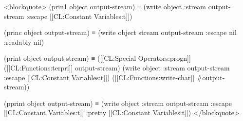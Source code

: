 <blockquote> 
(prin1 object output-stream) 
  ≡ (write object :stream output-stream :escape [[CL:Constant Variables:t]])

(princ object output-stream) 
  ≡ (write object stream output-stream :escape nil :readably nil)

(print object output-stream) 
  ≡ ([[CL:Special Operators:progn]] ([[CL:Functions:terpri]] output-stream) 
           (write object :stream output-stream :escape [[CL:Constant Variables:t]]) 
           ([[CL:Functions:write-char]] #\Space output-stream))

(pprint object output-stream) 
  ≡ (write object :stream output-stream :escape [[CL:Constant Variables:t]] :pretty [[CL:Constant Variables:t]])
</blockquote>

  

